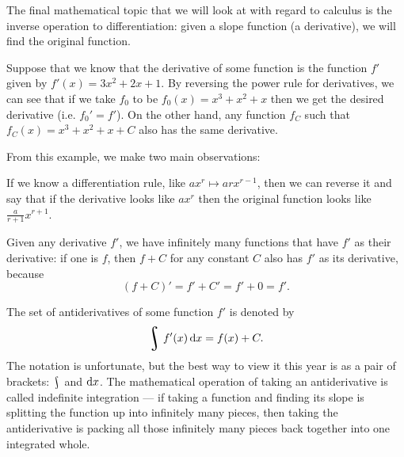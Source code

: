 



The final mathematical topic that we will look at with regard to calculus is the inverse operation to
differentiation: given a slope function (a derivative), we will find the original function.

\begin{ex}
  Suppose that we know that the derivative of some function is the function $ f' $ given by $ f'(x) = 3x^2 + 2x + 1 $. By reversing the power
  rule for derivatives, we can see that if we take $ f_0 $ to be $ f_0(x) = x^3 + x^2 + x $ then we get the desired derivative (i.e. $ f_0' = f' $).
  On the other hand, any function $ f_C $ such that $ f_C(x) = x^3 + x^2 + x + C $ also has the same derivative.
\end{ex}

From this example, we make two main observations:
\begin{obs}
  If we know a differentiation rule, like $ ax^r \mapsto arx^{r - 1} $, then we can reverse it and say that if the derivative
  looks like $ ax^r $ then the original function looks like $ \frac{a}{r + 1}x^{r + 1} $.
\end{obs}

\begin{obs}
  Given any derivative $ f' $, we have infinitely many functions that have $ f' $ as their derivative: if
  one is $ f $, then $ f + C $ for any constant $ C $ also has $ f' $ as its derivative, because
  \begin{displaymath}
    (f + C)' = f' + C' = f' + 0 = f'.
  \end{displaymath}
\end{obs}

The set of antiderivatives of some function $ f' $ is denoted by
\begin{displaymath}
  \rint f'(x) \dif{x} = f(x) + C.
\end{displaymath}
The notation is unfortunate, but the best way to view it this year is as a pair of brackets: $ \rint $ and $ \dif{x} $. The
mathematical operation of taking an antiderivative is called indefinite integration --- if taking a function and finding its
slope is splitting the function up into infinitely many pieces, then taking the antiderivative is packing all those infinitely
many pieces back together into one integrated whole.


